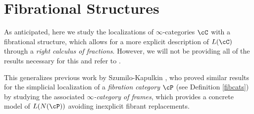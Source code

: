 



\section{Fibrational Structures}

As anticipated, here we study the localizations of $\infty$-categories $\cC$
with a fibrational structure, which allows for a more explicit
description of $L(\cC)$ through a \emph{right calculus of fractions}. However,
we will not be providing all of the results necessary
for this and refer to \cite[Ch.\ 7.2-7.4]{Cis19}.

This generalizes
previous work by Szumilo-Kapulkin \cite{Szu14,KS15}, who proved
similar results for the simplicial localization of a \emph{fibration category}
$\cP$ (see Definition \ref{fibcats})
by studying the associated \emph{$\infty$-category of frames}, which provides
a concrete model of $L(N(\cP))$ avoiding inexplicit fibrant replacements.

